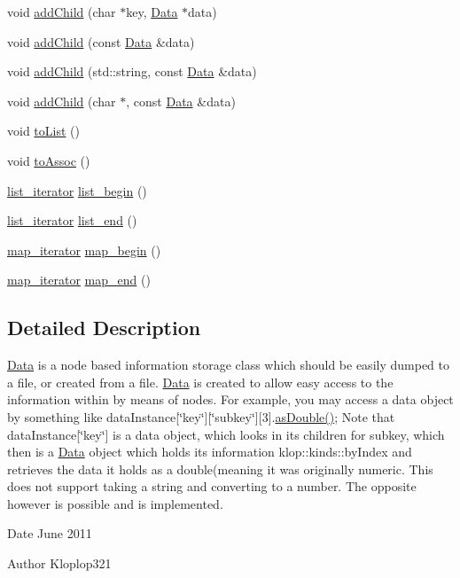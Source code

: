 \begin{DoxyCompactItemize}
void \hyperlink{classklop_1_1Data_a27792112ac7e77d53adbdee018709f5a}{addChild} (char $\ast$key, \hyperlink{classklop_1_1Data}{Data} $\ast$data)
\item 
void \hyperlink{classklop_1_1Data_a4b5a9f41274ce996455123a8a708c6c5}{addChild} (const \hyperlink{classklop_1_1Data}{Data} \&data)
\item 
void \hyperlink{classklop_1_1Data_ada55852e13a3cff79b078bd8ee13d050}{addChild} (std::string, const \hyperlink{classklop_1_1Data}{Data} \&data)
\item 
void \hyperlink{classklop_1_1Data_ad88ef4807f08f54747a17618ae867c6e}{addChild} (char $\ast$, const \hyperlink{classklop_1_1Data}{Data} \&data)
\item 
void \hyperlink{classklop_1_1Data_ae7a3793820ae499d010cf7dafcea3a66}{toList} ()
\item 
void \hyperlink{classklop_1_1Data_a4a8acdc0100edfdaa90612ad1745c2ee}{toAssoc} ()
\item 
\hyperlink{classklop_1_1Data_a8bcb1ee1639616047953b2459319ea3c}{list\_\-iterator} \hyperlink{classklop_1_1Data_a1f315f65d1aa487da0d41ce7036013ed}{list\_\-begin} ()
\item 
\hyperlink{classklop_1_1Data_a8bcb1ee1639616047953b2459319ea3c}{list\_\-iterator} \hyperlink{classklop_1_1Data_af807d06d9aa338e2831b7cd1e254ea51}{list\_\-end} ()
\item 
\hyperlink{classklop_1_1Data_ae1c3cec24a9d3a5cd53693f5d34195f2}{map\_\-iterator} \hyperlink{classklop_1_1Data_aeb6daca6708978a23903d5200293b915}{map\_\-begin} ()
\item 
\hyperlink{classklop_1_1Data_ae1c3cec24a9d3a5cd53693f5d34195f2}{map\_\-iterator} \hyperlink{classklop_1_1Data_abfe383165bdecf91c2e88f766f62e1d1}{map\_\-end} ()
\end{DoxyCompactItemize}


\subsection{Detailed Description}
\hyperlink{classklop_1_1Data}{Data} is a node based information storage class which should be easily dumped to a file, or created from a file. \hyperlink{classklop_1_1Data}{Data} is created to allow easy access to the information within by means of nodes. For example, you may access a data object by something like dataInstance\mbox{[}\char`\"{}key\char`\"{}\mbox{]}\mbox{[}\char`\"{}subkey\char`\"{}\mbox{]}\mbox{[}3\mbox{]}.\hyperlink{classklop_1_1Data_afd3558ce5f444beea44e33c2b50d87d0}{asDouble()}; Note that dataInstance\mbox{[}\char`\"{}key\char`\"{}\mbox{]} is a data object, which looks in its children for subkey, which then is a \hyperlink{classklop_1_1Data}{Data} object which holds its information klop::kinds::byIndex and retrieves the data it holds as a double(meaning it was originally numeric. This does not support taking a string and converting to a number. The opposite however is possible and is implemented. \begin{DoxyDate}{Date}
June 2011 
\end{DoxyDate}
\begin{DoxyAuthor}{Author}
Kloplop321 
\end{DoxyAuthor}


